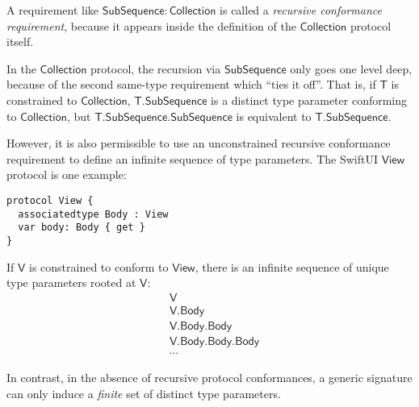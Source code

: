 \documentclass[a4paper,headsepline,bibliography=totoc,toc=flat,fleqn,twoside=semi]{scrbook}
\theoremstyle{definition}
\theoremstyle{definition}
\theoremstyle{definition}
\newcommand{\namesym}[1]{\mathsf{#1}}
\newcommand{\genericparam}[1]{\bm{\mathsf{#1}}}
\newcommand{\proto}[1]{\bm{\mathsf{#1}}}
\begin{document}
A requirement like $\namesym{SubSequence}\colon\proto{Collection}$ is called a  \emph{recursive conformance requirement}, because it appears inside the definition of the $\proto{Collection}$ protocol itself.

In the $\proto{Collection}$ protocol, the recursion via $\namesym{SubSequence}$ only goes one level deep, because of the second same-type requirement which ``ties it off''. That is, if $\genericparam{T}$ is constrained to $\proto{Collection}$, $\genericparam{T}.\namesym{SubSequence}$ is a distinct type parameter conforming to $\proto{Collection}$, but $\genericparam{T}.\namesym{SubSequence}.\namesym{SubSequence}$ is equivalent to $\genericparam{T}.\namesym{SubSequence}$.

However, it is also permissible to use an unconstrained recursive conformance requirement to define an infinite sequence of type parameters. The SwiftUI $\proto{View}$ protocol is one example:
\begin{Verbatim}
protocol View {
  associatedtype Body : View
  var body: Body { get }
}
\end{Verbatim}
If $\genericparam{V}$ is constrained to conform to $\proto{View}$, there is an infinite sequence of unique type parameters rooted at $\genericparam{V}$:
\begin{align*}
&\genericparam{V}\\
&\genericparam{V}.\namesym{Body}\\
&\genericparam{V}.\namesym{Body}.\namesym{Body}\\
&\genericparam{V}.\namesym{Body}.\namesym{Body}.\namesym{Body}\\
&\cdots
\end{align*}

In contrast, in the absence of recursive protocol conformances, a generic signature can only induce a \emph{finite} set of distinct type parameters.
\end{document}
